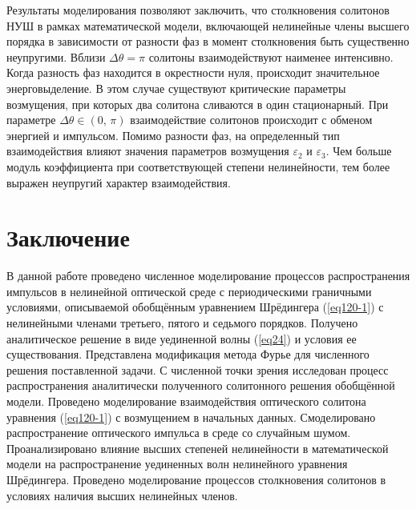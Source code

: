 \documentclass[12pt,a4paper]{article}
\begin{document}
	Результаты моделирования позволяют заключить, что столкновения солитонов НУШ в рамках математической модели, включающей нелинейные члены высшего порядка в зависимости от разности фаз в момент столкновения быть существенно неупругими. Вблизи \(\Delta \theta=\pi\) солитоны взаимодействуют наименее интенсивно. Когда разность фаз находится в окрестности нуля, происходит значительное энерговыделение. В этом случае существуют критические параметры возмущения, при которых два солитона сливаются в один стационарный. При параметре \(\Delta\theta\in (0,\,\pi)\) взаимодействие солитонов происходит с обменом энергией и импульсом. Помимо разности фаз, на определенный тип взаимодействия влияют значения параметров возмущения \(\varepsilon_{2}\) и \(\varepsilon_{3}\). Чем больше модуль коэффициента при соответствующей степени нелинейности, тем более выражен неупругий характер взаимодействия.
\section{Заключение}\label{ch400}
	В данной работе проведено численное моделирование процессов распространения импульсов в нелинейной оптической среде с периодическими граничными условиями, описываемой обобщённым уравнением Шрёдингера (\ref{eq120-1}) с нелинейными членами третьего, пятого и седьмого порядков. Получено аналитическое решение в виде уединенной волны (\ref{eq24}) и условия ее существования. Представлена модификация метода Фурье для численного решения поставленной задачи. С численной точки зрения исследован процесс распространения аналитически полученного солитонного решения обобщённой модели. Проведено моделирование взаимодействия оптического солитона уравнения (\ref{eq120-1}) с возмущением в начальных данных. Смоделировано распространение оптического импульса в среде со случайным шумом. Проанализировано влияние высших степеней нелинейности в математической модели на распространение уединенных волн нелинейного уравнения Шрёдингера. Проведено моделирование процессов столкновения солитонов в условиях наличия высших нелинейных членов.
\end{document}
